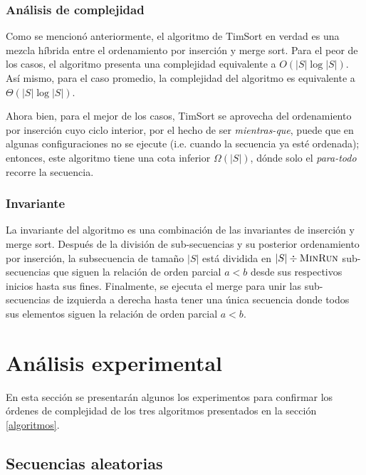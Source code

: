 \documentclass[letter]{article}
\begin{document}
\subsubsection{Análisis de complejidad} \label{algoritmos:timsort:complejidad}

Como se mencionó anteriormente, el algoritmo de TimSort en verdad es una mezcla híbrida entre el ordenamiento por inserción y merge sort. Para el peor de los casos, el algoritmo presenta una complejidad equivalente a $O(|S|\log|S|)$. Así mismo, para el caso promedio, la complejidad del algoritmo es equivalente a $\Theta(|S|\log|S|)$. \par

Ahora bien, para el mejor de los casos, TimSort se aprovecha del ordenamiento por inserción cuyo ciclo interior, por el hecho de ser {\it mientras-que}, puede que en algunas configuraciones no se ejecute (i.e. cuando la secuencia ya esté ordenada); entonces, este algoritmo tiene una cota inferior $\Omega(|S|)$, dónde solo el {\it para-todo} recorre la secuencia. \par

\subsubsection{Invariante} \label{algoritmos:timsort:invariante}

La invariante del algoritmo es una combinación de las invariantes de inserción y merge sort. Después de la división de sub-secuencias y su posterior ordenamiento por inserción, la subsecuencia de tamaño $|S|$ está dividida en $|S| \div \textsc{MinRun}$ sub-secuencias que siguen la relación de orden parcial $a<b$ desde sus respectivos inicios hasta sus fines. Finalmente, se ejecuta el merge para unir las sub-secuencias de izquierda a derecha hasta tener una única secuencia donde todos sus elementos siguen la relación de orden parcial $a<b$. \par


\section{Análisis experimental} \label{experimentos}

En esta sección se presentarán algunos los experimentos para confirmar los órdenes de complejidad de los tres algoritmos presentados en la sección \ref{algoritmos}.

\subsection{Secuencias aleatorias} \label{experimentos:aleatorias}
\end{document}
